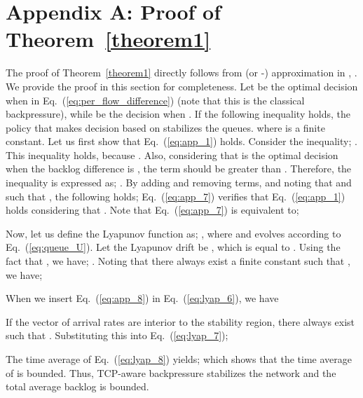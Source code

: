 \documentclass[conference]{IEEEtran}
\begin{document}
\section*{Appendix A: Proof of Theorem~\ref{theorem1}}
The proof of Theorem~\ref{theorem1} directly follows from  (or -) approximation in \cite{gamma_ksi_approximization}, \cite{neely_book}. We provide the proof in this section for completeness. Let  be the optimal decision when  in Eq.~(\ref{eq:per_flow_difference}) (note that this is the classical backpressure), while  be the decision when . If the following inequality holds, the policy that makes decision based on  stabilizes the queues.
 where  is a finite constant. Let us first show that Eq.~(\ref{eq:app_1}) holds. Consider the inequality; . This inequality holds, because   . Also, considering that  is the optimal decision when the backlog difference is , the term    should be greater than   . Therefore, the inequality is expressed as;  . By adding and removing terms, and noting that  and  such that , the following holds;
  Eq.~(\ref{eq:app_7}) verifies that Eq.~(\ref{eq:app_1}) holds considering that     .
Note that Eq.~(\ref{eq:app_7}) is equivalent to;

Now, let us define the Lyapunov function as; , where  and  evolves according to Eq.~(\ref{eq:queue_U}). Let the Lyapunov drift be , which is equal to  .
Using the fact that , we have;    . Noting that there always exist a finite constant  such that   , we have;

When we insert Eq.~(\ref{eq:app_8}) in Eq.~(\ref{eq:lyap_6}), we have

If the vector of arrival rates are interior to the stability region, there always exist  such that  . Substituting this into Eq.~(\ref{eq:lyap_7});

The time average of Eq.~(\ref{eq:lyap_8}) yields;
 which shows that the time average of  is bounded. Thus, TCP-aware backpressure stabilizes the network and the total average backlog is bounded.
\end{document}
